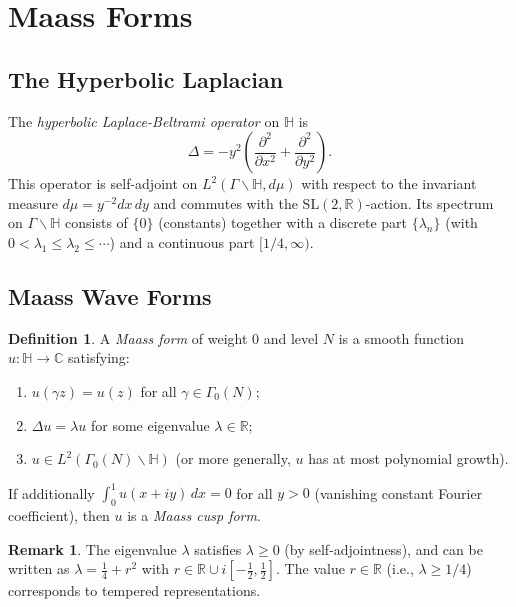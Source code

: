 \documentclass[12pt,a4paper]{amsart}
\theoremstyle{definition}
\newtheorem{definition}[theorem]{Definition}
\newtheorem{remark}[theorem]{Remark}
\newcommand{\HH}{\mathbb{H}}
\newcommand{\RR}{\mathbb{R}}
\newcommand{\CC}{\mathbb{C}}
\newcommand{\SL}{\mathrm{SL}}
\begin{document}
\section{Maass Forms}
\label{sec:maass}

\subsection{The Hyperbolic Laplacian}

The \emph{hyperbolic Laplace-Beltrami operator} on $\HH$ is
\[
\Delta = -y^2 \!\left(\frac{\partial^2}{\partial x^2} + \frac{\partial^2}{\partial y^2}\right).
\]
This operator is self-adjoint on $L^2(\Gamma \backslash \HH, d\mu)$ with respect to
the invariant measure $d\mu = y^{-2} dx\, dy$ and commutes with the $\SL(2,\RR)$-action.
Its spectrum on $\Gamma \backslash \HH$ consists of $\{0\}$ (constants) together with
a discrete part $\{\lambda_n\}$ (with $0 < \lambda_1 \leq \lambda_2 \leq \cdots$) and
a continuous part $[1/4, \infty)$.

\subsection{Maass Wave Forms}

\begin{definition}
A \emph{Maass form} of weight $0$ and level $N$ is a smooth function
$u : \HH \to \CC$ satisfying:
\begin{enumerate}[label=(\roman*)]
\item $u(\gamma z) = u(z)$ for all $\gamma \in \Gamma_0(N)$;
\item $\Delta u = \lambda u$ for some eigenvalue $\lambda \in \RR$;
\item $u \in L^2(\Gamma_0(N) \backslash \HH)$ (or more generally, $u$ has at most
  polynomial growth).
\end{enumerate}
If additionally $\int_0^1 u(x+iy)\, dx = 0$ for all $y > 0$ (vanishing constant
Fourier coefficient), then $u$ is a \emph{Maass cusp form}.
\end{definition}

\begin{remark}
The eigenvalue $\lambda$ satisfies $\lambda \geq 0$ (by self-adjointness), and
can be written as $\lambda = \frac{1}{4} + r^2$ with $r \in \RR \cup i[-\tfrac{1}{2}, \tfrac{1}{2}]$.
The value $r \in \RR$ (i.e., $\lambda \geq 1/4$) corresponds to tempered representations.
\end{remark}
\end{document}
